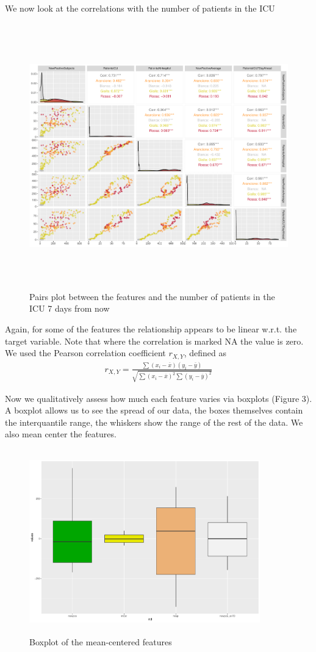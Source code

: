 \documentclass[12pt,a4paper]{article}
\theoremstyle{definition}
\theoremstyle{remark}
\begin{document}
	\newpage
	We now look at the correlations with the number of patients in the ICU
		\begin{figure}[htb!]
		\centering
		\includegraphics[width=150mm, height=115mm,scale=0.5]{corrplot1.pdf}
		\caption{Pairs plot between the features and the number of patients in the ICU 7 days from now}
	\end{figure}
	
	
	Again, for some of the features the relationship appears to be linear w.r.t. the target variable. Note that where the correlation is marked NA the value is zero. We used the Pearson correlation coefficient $r_{X,Y}$, defined as
	\begin{align*}
		r_{X,Y} = \frac{\sum(x_i-\overline{x})(y_i-\overline{y})}{\sqrt{\sum(x_i-\overline{x})^2\sum(y_i-\overline{y})^2}}
	\end{align*}


    Now we qualitatively assess how much each feature varies via boxplots (Figure 3). A boxplot allows us to see the spread of our data, the boxes themselves contain the interquantile range, the whiskers show the range of the rest of the data. We also mean center the features.
    	\begin{figure}[htb!]
    	\centering
    	\includegraphics[width=100mm, height=80mm,scale=0.5]{box.pdf}
    	\caption{Boxplot of the mean-centered features}
    \end{figure}
    
\end{document}
